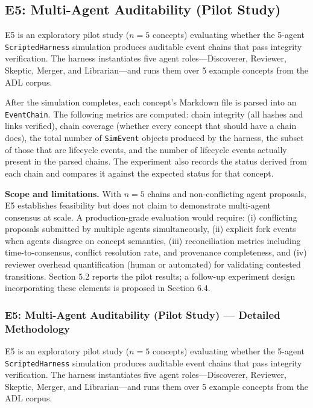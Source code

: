 \subsection{E5: Multi-Agent Auditability (Pilot Study)}\label{e5-multi-agent-auditability-pilot-study}

E5 is an exploratory pilot study (\(n=5\) concepts) evaluating whether the 5-agent \texttt{ScriptedHarness} simulation produces auditable event chains that pass integrity verification. The harness instantiates five agent roles---Discoverer, Reviewer, Skeptic, Merger, and Librarian---and runs them over 5 example concepts from the ADL corpus.

After the simulation completes, each concept's Markdown file is parsed into an \texttt{EventChain}. The following metrics are computed: chain integrity (all hashes and links verified), chain coverage (whether every concept that should have a chain does), the total number of \texttt{SimEvent} objects produced by the harness, the subset of those that are lifecycle events, and the number of lifecycle events actually present in the parsed chains. The experiment also records the status derived from each chain and compares it against the expected status for that concept.

\textbf{Scope and limitations.} With \(n=5\) chains and non-conflicting agent proposals, E5 establishes feasibility but does not claim to demonstrate multi-agent consensus at scale. A production-grade evaluation would require: (i) conflicting proposals submitted by multiple agents simultaneously, (ii) explicit fork events when agents disagree on concept semantics, (iii) reconciliation metrics including time-to-consensus, conflict resolution rate, and provenance completeness, and (iv) reviewer overhead quantification (human or automated) for validating contested transitions. Section 5.2 reports the pilot results; a follow-up experiment design incorporating these elements is proposed in Section 6.4.

\subsubsection{E5: Multi-Agent Auditability (Pilot Study) --- Detailed Methodology}\label{e5-multi-agent-auditability-pilot-study-detailed-methodology}

E5 is an exploratory pilot study (\(n=5\) concepts) evaluating whether the 5-agent \texttt{ScriptedHarness} simulation produces auditable event chains that pass integrity verification. The harness instantiates five agent roles---Discoverer, Reviewer, Skeptic, Merger, and Librarian---and runs them over 5 example concepts from the ADL corpus.

